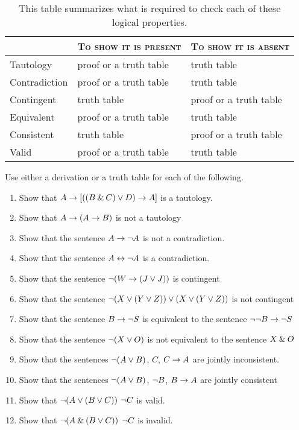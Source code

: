 \begin{table*}\centering\sffamily\footnotesize
{}
\begin{tabular}{@{}l l l@{}}\toprule
					&	\textsc{To show it is present} &	\textsc{To show it is absent} \\\midrule
Tautology 		& proof or a truth table 							& truth table \\
Contradiction 	&  proof or a truth table  		 				& truth table\\ 
Contingent		& truth table 										& proof or a truth table\\
Equivalent 		& proof or a truth table 		 					& truth table\\
Consistent 		& truth table 										& proof or a truth table\\
Valid 				& proof or a truth table 							& truth table \\ 
\bottomrule
\end{tabular}
\caption{This table summarizes what is required to check each of these logical properties.}\label{table.proof-or-model}
\end{table*}




\practiceproblems
\noindent\problempart Use either a derivation or a truth table for each of the following. 
\begin{enumerate}%
\item Show that $A \rightarrow [((B \mathbin{\&} C) \vee D) \rightarrow A]$ is a tautology.
\item Show that $A \rightarrow (A \rightarrow B)$ is not a tautology
\item Show that the sentence $A \rightarrow {\neg}{A}$ is not a contradiction.
\item Show that the sentence $A \leftrightarrow {\neg} A$ is a contradiction. 
\item Show that the sentence $ {\neg} (W \rightarrow (J \vee J)) $ is contingent
\item Show that the sentence $ {\neg}(X \vee (Y \vee Z)) \vee (X \vee (Y \vee Z))$ is not contingent
 \item Show that the sentence $B \rightarrow {\neg} S$ is equivalent to the sentence ${\neg} {\neg} B \rightarrow {\neg} S$
\item Show that the sentence $ {\neg} (X \vee O) $ is not equivalent to the sentence $X \mathbin{\&} O$
\item Show that the sentences ${\neg}(A \vee B)$, $C$, $C \rightarrow A$  are jointly inconsistent.
\item Show that the sentences ${\neg}(A \vee B)$, ${\neg}{B}$, $B \rightarrow A$ are jointly consistent
\item Show that ${\neg}(A \vee (B \vee C)) $ \therefore $ {\neg}{C}$ is valid.
\item Show that ${\neg}(A \mathbin{\&} (B \vee C))$ \therefore $ {\neg}{C}$ is invalid. 
\end{enumerate}


